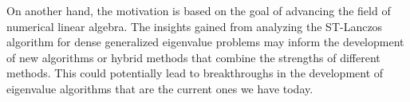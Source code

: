 On another hand, the motivation is based on the goal of advancing the field of numerical linear algebra. The insights gained from analyzing the ST-Lanczos algorithm for dense generalized eigenvalue problems may inform the development of new algorithms or hybrid methods that combine the strengths of different methods. This could potentially lead to breakthroughs in the development of eigenvalue algorithms that are  the current ones we have today.


